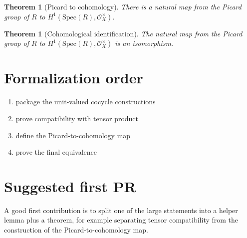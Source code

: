 \documentclass[11pt]{article}
\newtheorem{theorem}[definition]{Theorem}
\begin{document}
\begin{theorem}[Picard to cohomology]\label{thm:picard-to-cohomology}
There is a natural map from the Picard group of $R$ to
$H^1(\mathrm{Spec}(R), \mathcal{O}_X^\times)$.
\end{theorem}

\begin{theorem}[Cohomological identification]
\label{thm:cohomological-identification}
The natural map from the Picard group of $R$ to
$H^1(\mathrm{Spec}(R), \mathcal{O}_X^\times)$ is an isomorphism.
\end{theorem}

\section{Formalization order}

\begin{enumerate}
\item package the unit-valued cocycle constructions
\item prove compatibility with tensor product
\item define the Picard-to-cohomology map
\item prove the final equivalence
\end{enumerate}

\section{Suggested first PR}

A good first contribution is to split one of the large statements into a helper
lemma plus a theorem, for example separating tensor compatibility from the
construction of the Picard-to-cohomology map.
\end{document}
